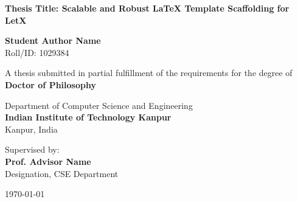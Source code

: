 \begin{titlepage}
\begin{center}
    \vspace*{1cm}
    
    
    \vspace{1.5cm}
    
    {\huge \bfseries \color{primary} Thesis Title: Scalable and Robust LaTeX Template Scaffolding for LetX}
    
    \vspace{1.5cm}
    
    {\Large \bfseries Student Author Name} \\
    \vspace{0.2cm}
    {Roll/ID: 1029384}
    
    \vspace{1.5cm}
    
    {A thesis submitted in partial fulfillment of the requirements for the degree of} \\
    \vspace{0.3cm}
    {\large \bfseries \color{secondary} Doctor of Philosophy}
    
    \vspace{1.5cm}
    
    {Department of Computer Science and Engineering} \\
    \vspace{0.2cm}
    {\large \bfseries \color{primary} Indian Institute of Technology Kanpur} \\
    \vspace{0.1cm}
    {Kanpur, India}
    
    \vfill
    
    {Supervised by:} \\
    {\large \bfseries Prof. Advisor Name} \\
    {Designation, CSE Department}
    
    \vspace{1cm}
    
    {\large \today}
    
\end{center}
\end{titlepage}
